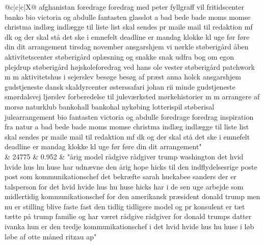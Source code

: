 \begin{xltabular}{\linewidth}{@{}c|c|c|X@{}}
afghanistan foredrage foredrag med peter fyllgraff vil fritidscenter banko bio victoria og abdulle fantasten glasslot a bad bede bade moms momse christma indlæg indlægge til liste list skal sendes pr maile mail til redaktion mf dk og der skal stå det ske i emnefelt deadline er mandag klokke kl uge før føre din dit arrangement tirsdag november ansgarshjem vi nørkle støberigård åben aktivitetscenter støberigård oplæsning og snakke snak udfra bog om egon plejdrup støberigård højskoleforedrag ved hans ole vester støberigård patchwork m m aktivitetshus i sejerslev besøge besøg af præst anna holck ansgarshjem gudstjeneste dansk skaldyrcenter østerssafari johan rii minde gudstjeneste smørdalsvej ljørslev forberedelse til juleværksted mørkehistorier m m arrangere af morsø naturklub bankohall bankohal nykøbing lotterispil støberisal julearrangement bio fantasten victoria og abdulle foredrage foredrag inspiration fra natur a bad bede bade moms momse christma indlæg indlægge til liste list skal sendes pr maile mail til redaktion mf dk og der skal stå det ske i emnefelt deadline er mandag klokke kl uge før føre din dit arrangement" \\
		 & 24775 & 0.952 & "årig model rådgive rådgiver trump washington det hvid hvide hus hu huse har udnævne den årig hope hicks til den indflydelsesrige poste post som kommunikationschef det bekræfte sarah huckabee sanders der er talsperson for det hvid hvide hus hu huse hicks har i de sen uge arbejde som midlertidig kommunikationschef for den amerikansk præsident donald trump men nu er stilling blive faste fast den tidlig tidligere model og pr konsulent er tæt tætte på trump familie og har været rådgive rådgiver for donald trumps datter ivanka hun er den tredje kommunikationschef i det hvid hvide hus hu huse i løb løbe af otte måned ritzau ap" \\
		\midrule

\end{xltabular}
